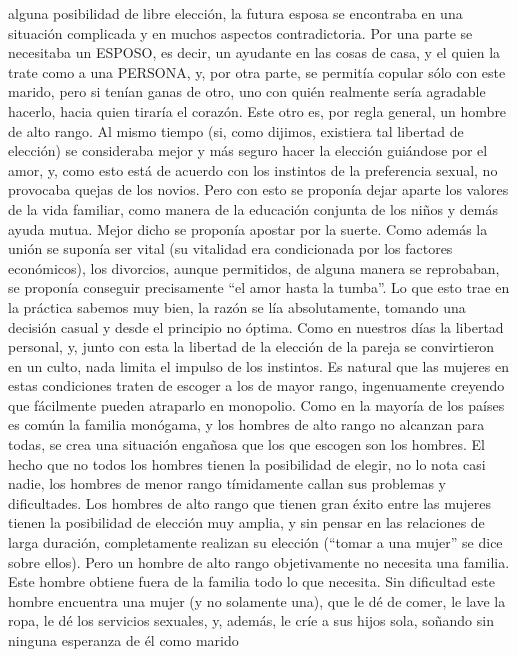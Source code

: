 alguna posibilidad de libre elección, la futura esposa se encontraba en
una situación complicada y en muchos aspectos contradictoria. Por una
parte se necesitaba un ESPOSO, es decir, un ayudante en las cosas de
casa, y el quien la trate como a una PERSONA, y, por otra parte, se
permitía copular sólo con este marido, pero si tenían ganas de otro, uno
con quién realmente sería agradable hacerlo, hacia quien tiraría el
corazón. Este otro es, por regla general, un hombre de alto rango. Al
mismo tiempo (si, como dijimos, existiera tal libertad de elección) se
consideraba mejor y más seguro hacer la elección guiándose por el amor,
y, como esto está de acuerdo con los instintos de la preferencia sexual,
no provocaba quejas de los novios. Pero con esto se proponía dejar
aparte los valores de la vida familiar, como manera de la educación
conjunta de los niños y demás ayuda mutua. Mejor dicho se proponía
apostar por la suerte. Como además la unión se suponía ser vital (su
vitalidad era condicionada por los factores económicos), los divorcios,
aunque permitidos, de alguna manera se reprobaban, se proponía conseguir
precisamente ``el amor hasta la tumba''. Lo que esto trae en la práctica
sabemos muy bien, la razón se lía absolutamente, tomando una decisión
casual y desde el principio no óptima. Como en nuestros días la libertad
personal, y, junto con esta la libertad de la elección de la pareja se
convirtieron en un culto, nada limita el impulso de los instintos. Es
natural que las mujeres en estas condiciones traten de escoger a los de
mayor rango, ingenuamente creyendo que fácilmente pueden atraparlo en
monopolio. Como en la mayoría de los países es común la familia
monógama, y los hombres de alto rango no alcanzan para todas, se crea
una situación engañosa que los que escogen son los hombres. El hecho que
no todos los hombres tienen la posibilidad de elegir, no lo nota casi
nadie, los hombres de menor rango tímidamente callan sus problemas y
dificultades. Los hombres de alto rango que tienen gran éxito entre las
mujeres tienen la posibilidad de elección muy amplia, y sin pensar en
las relaciones de larga duración, completamente realizan su elección
(``tomar a una mujer'' se dice sobre ellos). Pero un hombre de alto
rango objetivamente no necesita una familia. Este hombre obtiene fuera
de la familia todo lo que necesita. Sin dificultad este hombre encuentra
una mujer (y no solamente una), que le dé de comer, le lave la ropa, le
dé los servicios sexuales, y, además, le críe a sus hijos sola, soñando
sin ninguna esperanza de él como marido\\

